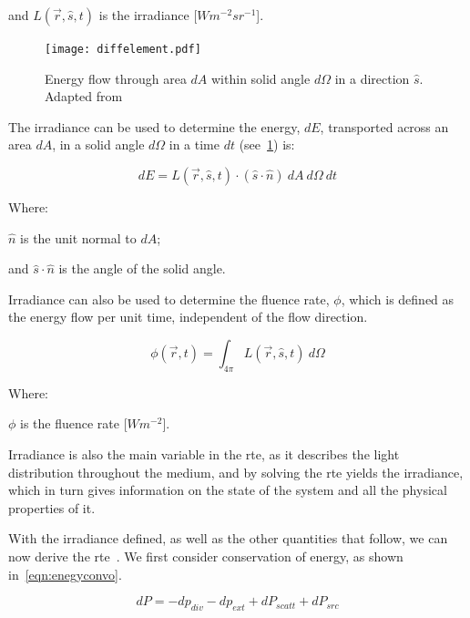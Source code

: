 \indent and $L(\vec{r},\hat{s},t)$ is the irradiance [$W m^{-2} sr^{-1}$].

\medskip

\begin{figure}[!htb]
	\centering
	\texttt{[image: diffelement.pdf]}
	\caption{Energy flow through area $dA$ within solid angle $d\Omega$ in a direction $\hat{s}$. Adapted from~\cite{wang2012biomedical,chandrasekhar2013radiative}}
	\label{fig:energydiag1}
\end{figure}

The irradiance can be used to determine the energy, $dE$, transported across an area $dA$, in a solid angle $d\Omega$ in a time $dt$ (see~\cref{fig:energydiag1}) is:

\begin{equation}
	dE = L(\vec{r},\hat{s},t) \cdot (\hat{s} \cdot \hat{n})\ dA\ d\Omega\ dt
\end{equation}

\noindent Where:

\indent $\hat{n}$ is the unit normal to $dA$;

\indent and $\hat{s}\cdot\hat{n}$ is the angle of the solid angle.

\medskip

Irradiance can also be used to determine the fluence rate, $\phi$, which is defined as the energy flow per unit time, independent of the flow direction.

\begin{equation}
	\phi(\vec{r},t)=\int_{4\pi}L(\vec{r},\hat{s},t)\ d\Omega
\end{equation}

\noindent Where:

\indent $\phi$ is the fluence rate [$W m^{-2}$].

\medskip

Irradiance is also the main variable in the \gls{rte}, as it describes the light distribution throughout the medium, and by solving the \gls{rte} yields the irradiance, which in turn gives information on the state of the system and all the physical properties of it.

With the irradiance defined, as well as the other quantities that follow, we can now derive the \gls{rte}~\cite{chandrasekhar2013radiative,wang2012biomedical}. We first consider conservation of energy, as shown in~\cref{eqn:enegyconvo}.

\begin{equation}
	dP = -dp_{div} - dp_{ext} + dP_{scatt} + dP_{src}
	\label{eqn:enegyconvo}
\end{equation}

